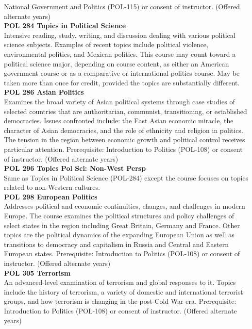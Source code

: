 \documentclass[
  letterpaper,
]{scrbook}
\begin{document}
National Government and Politics (POL-115) or consent of instructor.
(Offered alternate years)\\
\textbf{POL 284 Topics in Political Science}\\
Intensive reading, study, writing, and discussion dealing with various
political science subjects. Examples of recent topics include political
violence, environmental politics, and Mexican politics. This course may
count toward a political science major, depending on course content, as
either an American government course or as a comparative or
international politics course. May be taken more than once for credit,
provided the topics are substantially different.\\
\textbf{POL 286 Asian Politics}\\
Examines the broad variety of Asian political systems through case
studies of selected countries that are authoritarian, communist,
transitioning, or established democracies. Issues confronted include:
the East Asian economic miracle, the character of Asian democracies, and
the role of ethnicity and religion in politics. The tension in the
region between economic growth and political control receives particular
attention. Prerequisite: Introduction to Politics (POL-108) or consent
of instructor. (Offered alternate years)\\
\textbf{POL 296 Topics Pol Sci: Non-West Persp}\\
Same as Topics in Political Science (POL-284) except the course focuses
on topics related to non-Western cultures.\\
\textbf{POL 298 European Politics}\\
Addresses political and economic continuities, changes, and challenges
in modern Europe. The course examines the political structures and
policy challenges of select states in the region including Great
Britain, Germany and France. Other topics are the political dynamics of
the expanding European Union as well as transitions to democracy and
capitalism in Russia and Central and Eastern European states.
Prerequisite: Introduction to Politics (POL-108) or consent of
instructor. (Offered alternate years)\\
\textbf{POL 305 Terrorism}\\
An advanced-level examination of terrorism and global responses to it.
Topics include the history of terrorism, a variety of domestic and
international terrorist groups, and how terrorism is changing in the
post-Cold War era. Prerequisite: Introduction to Politics (POL-108) or
consent of instructor. (Offered alternate years)\\
\end{document}
